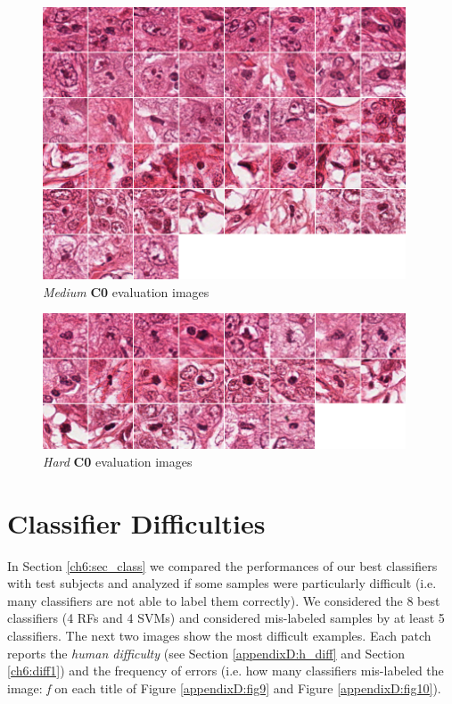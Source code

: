 \begin{figure}[!hb]
 \centering
  \includegraphics[width=0.96\textwidth]{./images/dataset/C0_med1.png}
  \caption{\textit{Medium} \textbf{C0} evaluation images}
  \label{appendixD:fig7}
\end{figure}

\clearpage

\begin{figure}[!ht]
 \centering
  \includegraphics[width=0.96\textwidth]{./images/dataset/C0_hard.png}
  \caption{\textit{Hard} \textbf{C0} evaluation images}
  \label{appendixD:fig8}
\end{figure}


\vspace{0.5cm}

\section{Classifier Difficulties}

\label{appendixD:cl_diff}
In Section \ref{ch6:sec_class} we compared the performances of our best classifiers with test subjects and analyzed if some samples were particularly
difficult (i.e. many classifiers are not able to label them correctly). We considered the 8 best classifiers (4 \Glspl{RF} and 4 \Glspl{SVM})
and considered mis-labeled samples by at least 5 classifiers. The next two images show the most difficult examples. Each patch reports the \textit{human difficulty} (see
Section \ref{appendixD:h_diff} and Section \ref{ch6:diff1}) and the frequency of errors (i.e. how many classifiers mis-labeled the image:
\textit{f} on each title of Figure \ref{appendixD:fig9} and Figure \ref{appendixD:fig10}).

